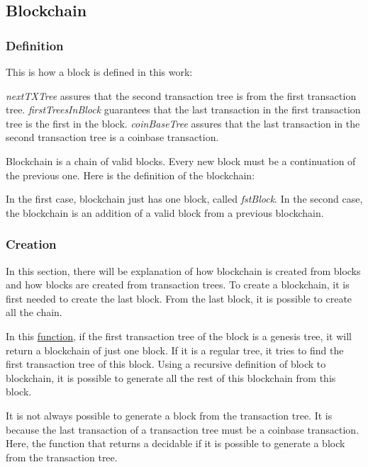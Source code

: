 \subsection{Blockchain}

\subsubsection{Definition}

This is how a block is defined in this work:


\emph{nextTXTree} assures that the second transaction tree is from the first transaction tree.
\emph{firstTreesInBlock} guarantees that the last transaction in the first transaction tree
is the first in the block.
\emph{coinBaseTree} assures that the last transaction in the second transaction tree is
a coinbase transaction.

Blockchain is a chain of valid blocks.
Every new block must be a continuation of the previous one.
Here is the definition of the blockchain:


In the first case, blockchain just has one block, called \emph{fstBlock}.
In the second case, the blockchain is an addition of a valid block from a previous blockchain.

\subsubsection{Creation}

In this section, there will be explanation of how blockchain is created from blocks
and how blocks are created from transaction trees.
To create a blockchain, it is first needed to create the last block.
From the last block, it is possible to create all the chain.


In this \hyperref[blockblockchain]{function}, if the first transaction tree of the block
is a genesis tree,
it will return a blockchain of just one block.
If it is a regular tree, it tries to find the first transaction tree of this block.
Using a recursive definition of block to blockchain,
it is possible to generate all the rest of this blockchain from this block.

It is not always possible to generate a block from the transaction tree.
It is because the last transaction of a transaction tree must be a coinbase transaction.
Here, the function that returns a decidable if it is possible to generate a block from
the transaction tree.

